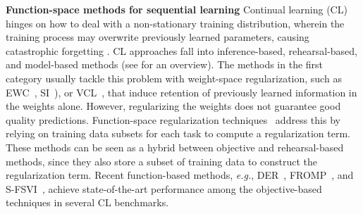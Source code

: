 \documentclass{article}
\makeatletter
\newcommand{\eg}{\textit{e.g.\@}\xspace}
\makeatother
\begin{document}

\textbf{Function-space methods for sequential learning} 
Continual learning (CL) hinges on how to deal with a non-stationary training distribution, wherein the training process may overwrite previously learned parameters, causing catastrophic forgetting \citep{mccloskey1989catastrophic}. CL approaches fall into inference-based, rehearsal-based, and model-based methods (see \cite{parisi2019continual, de2021continual} for an overview). The methods in the first category usually tackle this problem with weight-space regularization, such as EWC~\citep{kirkpatrick2017overcoming}, SI~\citep{zenke2017continual}), or VCL~\citep{nguyen-tuongModel2009}, that induce retention of previously learned information in the weights alone. However, regularizing the weights does not guarantee good quality predictions. Function-space regularization techniques~\cite{li2018lwf, benjamin2018measuring, titsias2019functional, buzzega2020dark, pan2020continual, rudner2022continual} address this by relying on training data subsets for each task to compute a regularization term. 
These methods can be seen as a hybrid between objective and rehearsal-based methods, since they also store a subset of training data to construct the regularization term.
Recent function-based methods, \eg, DER~\citep{buzzega2020dark}, FROMP~\citep{pan2020continual}, and S-FSVI~\citep{rudner2022continual}, achieve state-of-the-art performance among the objective-based techniques in several CL benchmarks. 
\end{document}
